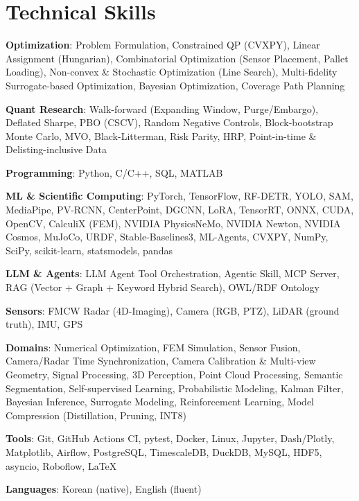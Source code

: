 \documentclass[letterpaper,11pt]{article}
\begin{document}
\section{Technical Skills}
 \begin{itemize}[leftmargin=0.15in, label={}, itemsep=0pt, parsep=0pt, topsep=0pt]
    \small{\item{\textbf{Optimization}{: Problem Formulation, Constrained QP (CVXPY), Linear Assignment (Hungarian), Combinatorial Optimization (Sensor Placement, Pallet Loading), Non-convex \& Stochastic Optimization (Line Search), Multi-fidelity Surrogate-based Optimization, Bayesian Optimization, Coverage Path Planning}}}
    \small{\item{\textbf{Quant Research}{: Walk-forward (Expanding Window, Purge/Embargo), Deflated Sharpe, PBO (CSCV), Random Negative Controls, Block-bootstrap Monte Carlo, MVO, Black-Litterman, Risk Parity, HRP, Point-in-time \& Delisting-inclusive Data}}}
    \small{\item{\textbf{Programming}{: Python, C/C++, SQL, MATLAB}}}
    \small{\item{\textbf{ML \& Scientific Computing}{: PyTorch, TensorFlow, RF-DETR, YOLO, SAM, MediaPipe, PV-RCNN, CenterPoint, DGCNN, LoRA, TensorRT, ONNX, CUDA, OpenCV, CalculiX (FEM), NVIDIA PhysicsNeMo, NVIDIA Newton, NVIDIA Cosmos, MuJoCo, URDF, Stable-Baselines3, ML-Agents, CVXPY, NumPy, SciPy, scikit-learn, statsmodels, pandas}}}
    \small{\item{\textbf{LLM \& Agents}{: LLM Agent Tool Orchestration, Agentic Skill, MCP Server, RAG (Vector + Graph + Keyword Hybrid Search), OWL/RDF Ontology}}}
    \small{\item{\textbf{Sensors}{: FMCW Radar (4D-Imaging), Camera (RGB, PTZ), LiDAR (ground truth), IMU, GPS}}}
    \small{\item{\textbf{Domains}{: Numerical Optimization, FEM Simulation, Sensor Fusion, Camera/Radar Time Synchronization, Camera Calibration \& Multi-view Geometry, Signal Processing, 3D Perception, Point Cloud Processing, Semantic Segmentation, Self-supervised Learning, Probabilistic Modeling, Kalman Filter, Bayesian Inference, Surrogate Modeling, Reinforcement Learning, Model Compression (Distillation, Pruning, INT8)}}}
    \small{\item{\textbf{Tools}{: Git, GitHub Actions CI, pytest, Docker, Linux, Jupyter, Dash/Plotly, Matplotlib, Airflow, PostgreSQL, TimescaleDB, DuckDB, MySQL, HDF5, asyncio, Roboflow, \LaTeX}}}
    \small{\item{\textbf{Languages}{: Korean (native), English (fluent)}}}
 \end{itemize}
\end{document}

